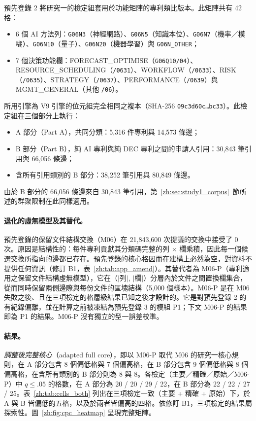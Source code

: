 預先登錄 2 將研究一的檢定組套用於功能矩陣的專利類比版本。此矩陣共有 42 格：
\begin{itemize}
  \item 6 個 AI 方法列：\texttt{G06N3}（神經網路）、\texttt{G06N5}（知識本位）、\texttt{G06N7}（機率／模糊）、\texttt{G06N10}（量子）、\texttt{G06N20}（機器學習）與 \texttt{G06N\_\allowbreak OTHER}；
  \item 7 個決策功能欄：FORECAST\_\allowbreak OPTIMISE（\texttt{G06Q10/04}）、RESOURCE\_\allowbreak SCHEDULING（\texttt{/0631}）、WORKFLOW（\texttt{/0633}）、RISK（\texttt{/0635}）、STRATEGY（\texttt{/0637}）、PERFORMANCE（\texttt{/0639}）與 MGMT\_\allowbreak GENERAL（其他 \texttt{/06}）。
\end{itemize}
所用引擎為 V9 引擎的位元組完全相同之複本（SHA-256 \texttt{09c3d60c\ldots bc33}）。此檢定組在三個部分上執行：
\begin{itemize}
  \item A 部分（Part A），共同分類：5,316 件專利與 14,573 條邊；
  \item B 部分（Part B），純 AI 專利與純 DEC 專利之間的申請人引用：30,843 筆引用與 66,056 條邊；
  \item 含所有引用類別的 B 部分：38,252 筆引用與 80,849 條邊。
\end{itemize}
由於 B 部分的 66,056 條邊來自 30,843 筆引用，第~\ref{zh:sec:study1_corpus}~節所述的群聚限制在此同樣適用。

\paragraph{退化的虛無模型及其替代。} 預先登錄的保留文件結構交換（M06）在 21,843,600 次提議的交換中接受了 0 次。原因是結構性的：每件專利貢獻其分類碼完整的列 $\times$ 欄乘積，因此每一個候選交換所指向的邊都已存在。預先登錄的核心格因而在建構上必然為空，對資料不提供任何資訊（修訂 B1，表~\ref{zh:tab:app_amend}）。其替代者為 M06-P（專利適用之保留文件結構虛無模型），它在（$|$列$|$, $|$欄$|$）分層內於文件之間置換欄集合，從而同時保留兩側邊際與每份文件的區塊結構（5,000 個樣本）。M06-P 是在 M06 失敗之後、且在三項檢定的格層級結果已知之後才設計的。它是對預先登錄 2 的有紀錄偏離，並在計算之前被凍結為預先登錄 3 的模組 P1；下文 M06-P 的結果即為 P1 的結果。M06-P 沒有獨立的型一誤差校準。

\paragraph{結果。} \emph{調整後完整核心}（adapted full core），即以 M06-P 取代 M06 的研究一核心規則，在 A 部分包含 8 個偏低格與 7 個偏高格，在 B 部分包含 9 個偏低格與 8 個偏高格，在含所有類別的 B 部分則為 8 與 8。各檢定（主要／精確／原始／M06-P）中 $q \le .05$ 的格數，在 A 部分為 20 / 20 / 29 / 22，在 B 部分為 22 / 22 / 27 / 25。表~\ref{zh:tab:cells_both} 列出在三項檢定一致（主要 + 精確 + 原始）下，於 A 與 B 皆偏低的五格，以及於兩者皆偏高的四格。依修訂 B1，三項檢定的結果屬探索性。圖~\ref{zh:fig:cpc_heatmap} 呈現完整矩陣。

